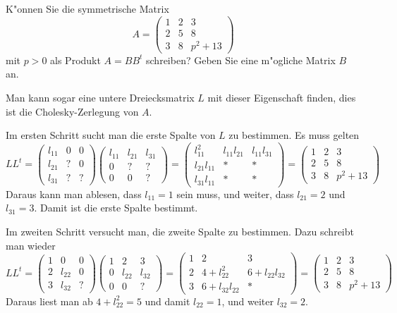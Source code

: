K"onnen Sie die symmetrische Matrix
\[
A=\begin{pmatrix}
 1&2&3\\
 2&5&8\\
 3&8&p^2 + 13
\end{pmatrix}
\]
mit $p>0$ als Produkt $A=BB^t$ schreiben?
Geben Sie eine m"ogliche Matrix $B$ an.

\begin{loesung}
Man kann sogar eine untere Dreiecksmatrix $L$ mit dieser Eigenschaft finden,
dies ist die Cholesky-Zerlegung von $A$.

Im ersten Schritt sucht man die erste Spalte von $L$ zu bestimmen.
Es muss gelten
\[
LL^t=
\begin{pmatrix}
l_{11}&  0&  0\\
l_{21}&  ?&  0\\
l_{31}&  ?&  ?
\end{pmatrix}
\begin{pmatrix}
l_{11}&l_{21}&l_{31}\\
     0&     ?&     ?\\
     0&     0&     ?
\end{pmatrix}
=
\begin{pmatrix}
    l_{11}^2&l_{11}l_{21}&l_{11}l_{31}\\
l_{21}l_{11}&           *&           *\\
l_{31}l_{11}&           *&           *
\end{pmatrix}
=
\begin{pmatrix}
 1&2&3\\
 2&5&8\\
 3&8&p^2 + 13
\end{pmatrix}
\]
Daraus kann man ablesen, dass $l_{11}=1$ sein muss, und weiter,
dass
$l_{21}=2$ und $l_{31}=3$. Damit ist die erste Spalte bestimmt.

Im zweiten Schritt versucht man, die zweite Spalte zu bestimmen.
Dazu schreibt man wieder
\[
LL^t
=
\begin{pmatrix}
1&     0&0\\
2&l_{22}&0\\
3&l_{32}&?
\end{pmatrix}
\begin{pmatrix}
1&     2&     3\\
0&l_{22}&l_{32}\\
0&     0&?
\end{pmatrix}
=
\begin{pmatrix}
 1&              2&             3\\
 2& 4+l_{22}^2    & 6+l_{22}l_{32}\\
 3& 6+l_{32}l_{22}&             *
\end{pmatrix}
=
\begin{pmatrix}
 1&2&3\\
 2&5&8\\
 3&8&p^2 + 13
\end{pmatrix}
\]
Daraus liest man ab $4+l_{22}^2=5$ und damit $l_{22}=1$, und weiter
$l_{32}=2$.


\end{loesung}
